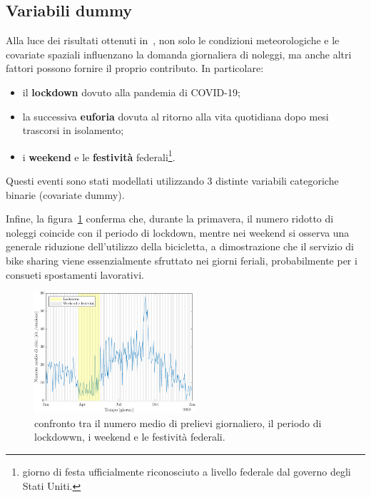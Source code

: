 \subsection[Variabili dummy]{Variabili dummy}
Alla luce dei risultati ottenuti in~\cite{paper_bike_sharing_Otto}, non solo le condizioni meteorologiche e le covariate spaziali influenzano la domanda giornaliera di noleggi, ma anche altri fattori possono fornire il proprio contributo. In particolare:
\begin{itemize}
	\item il \textbf{lockdown} dovuto alla pandemia di COVID-\num{19};
	\item la successiva \textbf{euforia} dovuta al ritorno alla vita quotidiana dopo mesi trascorsi in isolamento;
	\item i \textbf{weekend} e le \textbf{festività} federali\footnote{giorno di festa ufficialmente riconosciuto a livello federale dal governo degli Stati Uniti.}.
\end{itemize}
Questi eventi sono stati modellati utilizzando \num{3} distinte variabili categoriche binarie (covariate dummy).
\par Infine, la figura~\ref{ritiri_vs_dummy} conferma che, durante la primavera, il numero ridotto di noleggi coincide con il periodo di lockdown, mentre nei weekend si osserva una generale riduzione dell'utilizzo della bicicletta, a dimostrazione che il servizio di bike sharing viene essenzialmente sfruttato nei giorni feriali, probabilmente per i consueti spostamenti lavorativi.

\begin{figure}[htpb]
	\centering
	\includegraphics[height=170px]{Immagini/4. Caso di studio/Serie storiche/Ritiri giornalieri e dummy}
	\caption[Confronto tra il numero medio di prelievi giornaliero, il periodo di lockdowwn, i weekend e le festività federali.]{confronto tra il numero medio di prelievi giornaliero, il periodo di lockdowwn, i weekend e le festività federali.}
	\label{ritiri_vs_dummy}
\end{figure}

